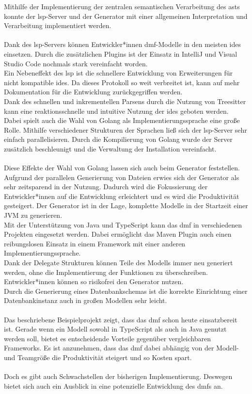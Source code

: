 \documentclass[./einleitung.tex]{subfiles}
\begin{document}
Mithilfe der Implementierung der zentralen semantischen Verarbeitung des \acrshort{ast}s konnte der \acrshort{lsp}-Server und der Generator mit einer allgemeinen Interpretation und Verarbeitung implementiert werden.
\\\\
Dank des \acrshort{lsp}-Servers können Entwickler*innen \acrshort{dmf}-Modelle in den meisten \acrshort{ide}s einsetzen.
Durch die zusätzlichen Plugins ist der Einsatz in IntelliJ und Visual Studio Code nochmals stark vereinfacht worden.\\
Ein Nebeneffekt des \acrshort{lsp} ist die schnellere Entwicklung von Erweiterungen für nicht kompatible \acrshort{ide}s.
Da dieses Protokoll so weit verbreitet ist, kann auf mehr Dokumentation für die Entwicklung zurückgegriffen werden.\\
Dank des schnellen und inkrementellen Parsens durch die Nutzung von Treesitter kann eine reaktionsschnelle und intuitive Nutzung der \acrshort{ide}s geboten werden.
Dabei spielt auch die Wahl von Golang als Implementierungssprache eine große Rolle.
Mithilfe verschiedener Strukturen der Sprachen ließ sich der \acrshort{lsp}-Server sehr einfach parallelisieren.
Durch die Kompilierung von Golang wurde der Server zusätzlich beschleunigt und die Verwaltung der Installation vereinfacht.
\\\\
Diese Effekte der Wahl von Golang lassen sich auch beim Generator feststellen.
Aufgrund der parallelen Generierung von Dateien erwies sich der Generator als sehr zeitsparend in der Nutzung.
Dadurch wird die Fokussierung der Entwickler*innen auf die Entwicklung erleichtert und es wird die Produktivität gesteigert.
Der Generator ist in der Lage, komplette Modelle in der Startzeit einer JVM zu generieren.\\
Mit der Unterstützung von Java und TypeScript kann das \acrshort{dmf} in verschiedenen Projekten eingesetzt werden.
Dabei ermöglicht das Maven Plugin auch einen reibungslosen Einsatz in einem Framework mit einer anderen Implementierungssprache.\\
Dank der Delegate Strukturen können Teile des Modells immer neu generiert werden, ohne die Implementierung der Funktionen zu überschreiben.
Entwickler*innen können so risikofrei den Generator nutzen.\\
Durch die Generierung eines Datenbankschemas ist die korrekte Einrichtung einer Datenbankinstanz auch in großen Modellen sehr leicht.
\\\\
Das beschriebene Beispielprojekt zeigt, dass das \acrshort{dmf} schon heute einsatzbereit ist.
Gerade wenn ein Modell sowohl in TypeScript als auch in Java genutzt werden soll, bietet es entscheidende Vorteile gegenüber vergleichbaren Frameworks.
Es ist anzunehmen, dass das \acrshort{dmf} dabei abhängig von der Modell- und Teamgröße die Produktivität steigert und so Kosten spart.
\\\\
Doch es gibt auch Schwachstellen der bisherigen Implementierung.
Deswegen bietet sich auch ein Ausblick in eine potenzielle Entwicklung des \acrshort{dmf}s an.
\end{document}
